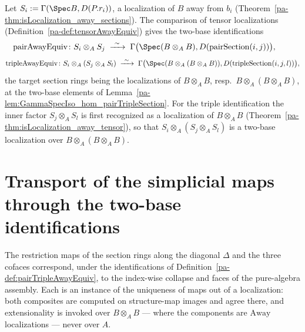 \begin{definition}
  \label{pa-def:pairTripleAwayEquiv}
  \leanok

  Let \(S_i := \Gamma(\Spec B, D(P.r_i))\), a localization of \(B\) away from \(b_i\)
  (Theorem~\ref{pa-thm:isLocalization_away_sections}). The comparison of tensor localizations
  (Definition~\ref{pa-def:tensorAwayEquiv}) gives the two-base identifications
  \[
    \mathrm{pairAwayEquiv} \colon S_i \otimes_A S_j \;\xrightarrow{\ \sim\ }\;
      \Gamma\bigl(\Spec(B \otimes_A B), D(\mathrm{pairSection}(i, j))\bigr), \qquad
  \]
  \[
    \mathrm{tripleAwayEquiv} \colon S_i \otimes_A (S_j \otimes_A S_l) \;\xrightarrow{\ \sim\ }\;
      \Gamma\bigl(\Spec(B \otimes_A (B \otimes_A B)), D(\mathrm{tripleSection}(i, j, l))\bigr) ,
  \]
  the target section rings being the localizations of \(B \otimes_A B\), resp.\
  \(B \otimes_A (B \otimes_A B)\), at the two-base elements of
  Lemma~\ref{pa-lem:GammaSpecIso_hom_pairTripleSection}. For the triple identification the inner
  factor \(S_j \otimes_A S_l\) is first recognized as a localization of \(B \otimes_A B\)
  (Theorem~\ref{pa-thm:isLocalization_away_tensor}), so that
  \(S_i \otimes_A (S_j \otimes_A S_l)\) is a two-base localization over
  \(B \otimes_A (B \otimes_A B)\).
\end{definition}

\section{Transport of the simplicial maps through the two-base identifications}
\label{pa-sec:witnessTransport}

The restriction maps of the section rings along the diagonal \(\Delta\) and the three cofaces
correspond, under the identifications of Definition~\ref{pa-def:pairTripleAwayEquiv}, to the
index-wise collapse and faces of the pure-algebra assembly. Each is an instance of the
uniqueness of maps out of a localization: both composites are computed on structure-map
images and agree there, and extensionality is invoked over \(B \otimes_A B\) — where the
components are \(\mathrm{Away}\) localizations — never over \(A\).

